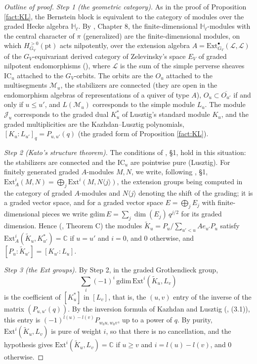 \documentclass[a4paper,12pt,leqno]{amsart}
\newcommand{\caJ}{\mathcal{J}}
\newcommand{\caM}{\mathcal{M}}
\theoremstyle{plain}
\theoremstyle{definition}
\theoremstyle{definition}
\begin{document}
\begin{proof}[Outline of proof]
\emph{Step 1 (the geometric category).} As in the proof of Proposition \ref{fact:KL}, the Bernstein
block is equivalent to the category of modules over the graded Hecke algebra $\mathbb{H}_\ell$. By
\cite{CG97}, Chapter 8, the finite-dimensional $\mathbb{H}_\ell$-modules with the central character
of $\pi$ (generalized) are the finite-dimensional modules, on which $H^{>0}_{G_V}(\mathrm{pt})$ acts
nilpotently, over the extension algebra $A=\mathrm{Ext}^\bullet_{G_V}(\mathcal{L},\mathcal{L})$ of
the $G_V$-equivariant derived category of Zelevinsky's space $E_V$ of graded nilpotent endomorphisms
(\cite{Zel85}), where $\mathcal{L}$ is the sum of the simple perverse sheaves $\mathrm{IC}_u$ attached
to the $G_V$-orbits. The orbits are the $O_u$ attached to the multisegments $\caM_u$, the stabilizers
are connected (they are open in the endomorphism algebras of representations of a quiver of type
$A$), $O_u\subset\overline{O_{u'}}$ if and only if $u\leq u'$, and $L(\caM_u)$ corresponds to the
simple module $L_u$. The module $\caJ_u$ corresponds to the graded dual $K_u^*$ of Lusztig's standard
module $K_u$, and the graded multiplicities are the Kazhdan--Lusztig polynomials,
$[K_u:L_{u'}]_q=P_{u,u'}(q)$ (the graded form of Proposition \ref{fact:KL}).

\emph{Step 2 (Kato's structure theorem).} The conditions of \cite{Kat17}, \S1, hold in this
situation: the stabilizers are connected and the $\mathrm{IC}_u$ are pointwise pure (Lusztig).
For finitely generated graded $A$-modules $M,N$, we write, following \cite{Kat17}, \S1,
$\mathrm{Ext}^i_A(M,N)=\bigoplus_j\mathrm{Ext}^i(M,N\langle j\rangle)$, the extension groups being computed in
the category of graded $A$-modules and $N\langle j\rangle$ denoting the shift of the grading; it is a graded
vector space, and for a graded vector space $E=\bigoplus_jE_j$ with finite-dimensional pieces we write
$\mathrm{gdim}\,E=\sum_j\dim(E_j)\,q^{j/2}$ for its graded dimension. Hence (\cite{Kat17}, Theorem C) the modules $\widetilde K_u=P_u/\sum_{u'<u}Ae_{u'}P_u$ satisfy
$\mathrm{Ext}^i_A(\widetilde K_u,K_{u'}^*)=\mathbb{C}$ if $u=u'$ and $i=0$, and $0$ otherwise, and
$[P_u:\widetilde K_{u'}]=[K_{u'}:L_u]$.

\emph{Step 3 (the Ext groups).} By Step 2, in the graded Grothendieck group,
\[\textstyle\sum_i(-1)^i\,\mathrm{gdim}\,\mathrm{Ext}^i(\widetilde K_u,L_v)\]
is the coefficient of $[K_u^*]$ in $[L_v]$, that is,
the $(u,v)$ entry of the inverse of the matrix $(P_{u,u'}(q))$. By the inversion formula of Kazhdan and
Lusztig (\cite{KL79}, (3.1)), this entry is $(-1)^{l(u)-l(v)}P_{w_0u,w_0v}$, up to a power of $q$. By
purity, $\mathrm{Ext}^i(\widetilde K_u,L_v)$ is pure of weight $i$, so that there is no cancellation,
and the hypothesis gives $\mathrm{Ext}^i(\widetilde K_u,L_v)=\mathbb{C}$ if $u\geq v$ and
$i=l(u)-l(v)$, and $0$ otherwise.


\end{proof}
\end{document}
